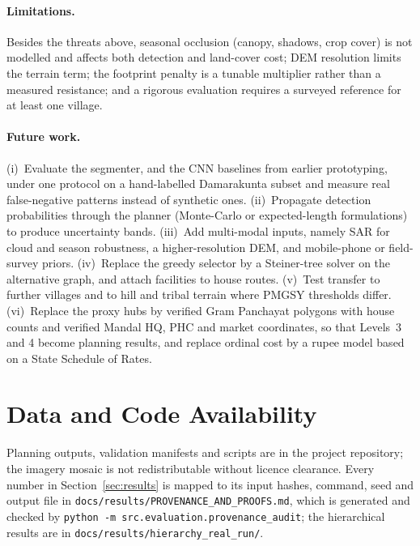 \documentclass[journal]{IEEEtran}
\begin{document}
\paragraph{Limitations.} Besides the threats above, seasonal occlusion (canopy, shadows, crop cover) is not modelled and affects both detection and land-cover cost; DEM resolution limits the terrain term; the footprint penalty is a tunable multiplier rather than a measured resistance; and a rigorous evaluation requires a surveyed reference for at least one village.

\paragraph{Future work.} (i)~Evaluate the segmenter, and the CNN baselines from earlier prototyping, under one protocol on a hand-labelled Damarakunta subset and measure real false-negative patterns instead of synthetic ones. (ii)~Propagate detection probabilities through the planner (Monte-Carlo or expected-length formulations) to produce uncertainty bands. (iii)~Add multi-modal inputs, namely SAR for cloud and season robustness, a higher-resolution DEM, and mobile-phone or field-survey priors. (iv)~Replace the greedy selector by a Steiner-tree solver on the alternative graph, and attach facilities to house routes. (v)~Test transfer to further villages and to hill and tribal terrain where PMGSY thresholds differ. (vi)~Replace the proxy hubs by verified Gram Panchayat polygons with house counts and verified Mandal HQ, PHC and market coordinates, so that Levels~3 and 4 become planning results, and replace ordinal cost by a rupee model based on a State Schedule of Rates.

\section*{Data and Code Availability}
Planning outputs, validation manifests and scripts are in the project repository; the imagery mosaic is not redistributable without licence clearance. Every number in Section~\ref{sec:results} is mapped to its input hashes, command, seed and output file in \texttt{docs/results/PROVENANCE\_AND\_PROOFS.md}, which is generated and checked by \texttt{python -m src.evaluation.provenance\_audit}; the hierarchical results are in \texttt{docs/results/hierarchy\_real\_run/}.



\end{document}
